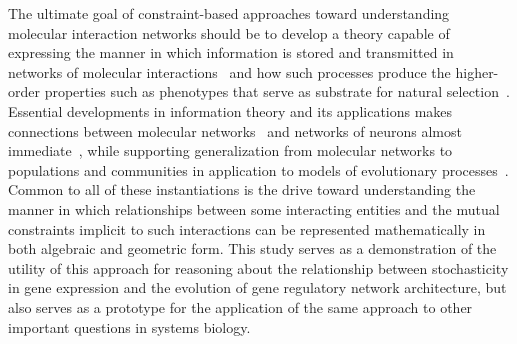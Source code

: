 
The ultimate goal of constraint-based approaches toward understanding molecular interaction networks should be to develop a theory capable of expressing the manner in which information is stored and transmitted in networks of molecular interactions~\cite{Tkacik2011a,Bialek2012} and how such processes produce the higher-order properties such as phenotypes that serve as substrate for natural selection~\cite{Mora2013}. Essential developments in information theory and its applications makes connections between molecular networks~\cite{Cheong2011,Brennan2012} and networks of neurons almost immediate~\cite{Stanley1999,Balduzzi2008,Balduzzi2009,Balduzzi2012}, while supporting generalization from molecular networks to populations and communities in application to models of evolutionary processes~\cite{Kussell2005a,Rivoire2011}. Common to all of these instantiations is the drive toward understanding the manner in which relationships between some interacting entities and the mutual constraints implicit to such interactions can be represented mathematically in both algebraic and geometric form. This study serves as a demonstration of the utility of this approach for reasoning about the relationship between stochasticity in gene expression and the evolution of gene regulatory network architecture, but also serves as a prototype for the application of the same approach to other important questions in systems biology.
